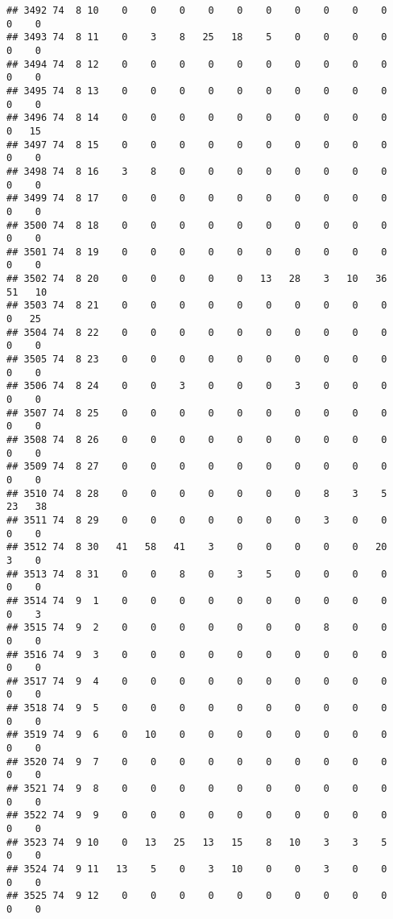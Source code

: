 \documentclass[]{article}
\begin{document}
\begin{verbatim}
## 3492 74  8 10    0    0    0    0    0    0    0    0    0    0    0    0
## 3493 74  8 11    0    3    8   25   18    5    0    0    0    0    0    0
## 3494 74  8 12    0    0    0    0    0    0    0    0    0    0    0    0
## 3495 74  8 13    0    0    0    0    0    0    0    0    0    0    0    0
## 3496 74  8 14    0    0    0    0    0    0    0    0    0    0    0   15
## 3497 74  8 15    0    0    0    0    0    0    0    0    0    0    0    0
## 3498 74  8 16    3    8    0    0    0    0    0    0    0    0    0    0
## 3499 74  8 17    0    0    0    0    0    0    0    0    0    0    0    0
## 3500 74  8 18    0    0    0    0    0    0    0    0    0    0    0    0
## 3501 74  8 19    0    0    0    0    0    0    0    0    0    0    0    0
## 3502 74  8 20    0    0    0    0    0   13   28    3   10   36   51   10
## 3503 74  8 21    0    0    0    0    0    0    0    0    0    0    0   25
## 3504 74  8 22    0    0    0    0    0    0    0    0    0    0    0    0
## 3505 74  8 23    0    0    0    0    0    0    0    0    0    0    0    0
## 3506 74  8 24    0    0    3    0    0    0    3    0    0    0    0    0
## 3507 74  8 25    0    0    0    0    0    0    0    0    0    0    0    0
## 3508 74  8 26    0    0    0    0    0    0    0    0    0    0    0    0
## 3509 74  8 27    0    0    0    0    0    0    0    0    0    0    0    0
## 3510 74  8 28    0    0    0    0    0    0    0    8    3    5   23   38
## 3511 74  8 29    0    0    0    0    0    0    0    3    0    0    0    0
## 3512 74  8 30   41   58   41    3    0    0    0    0    0   20    3    0
## 3513 74  8 31    0    0    8    0    3    5    0    0    0    0    0    0
## 3514 74  9  1    0    0    0    0    0    0    0    0    0    0    0    3
## 3515 74  9  2    0    0    0    0    0    0    0    8    0    0    0    0
## 3516 74  9  3    0    0    0    0    0    0    0    0    0    0    0    0
## 3517 74  9  4    0    0    0    0    0    0    0    0    0    0    0    0
## 3518 74  9  5    0    0    0    0    0    0    0    0    0    0    0    0
## 3519 74  9  6    0   10    0    0    0    0    0    0    0    0    0    0
## 3520 74  9  7    0    0    0    0    0    0    0    0    0    0    0    0
## 3521 74  9  8    0    0    0    0    0    0    0    0    0    0    0    0
## 3522 74  9  9    0    0    0    0    0    0    0    0    0    0    0    0
## 3523 74  9 10    0   13   25   13   15    8   10    3    3    5    0    0
## 3524 74  9 11   13    5    0    3   10    0    0    3    0    0    0    0
## 3525 74  9 12    0    0    0    0    0    0    0    0    0    0    0    0

\end{verbatim}
\end{document}
